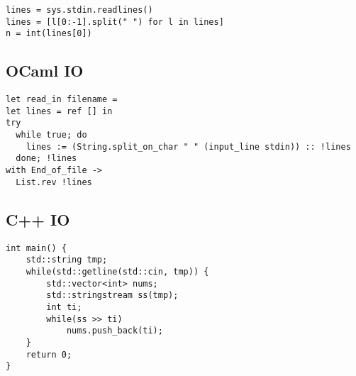 \documentclass[10pt,a4paper]{article}
\begin{document}
\begin{landscape}
\begin{multicols}{2}
\begin{lstlisting}
lines = sys.stdin.readlines()
lines = [l[0:-1].split(" ") for l in lines]
n = int(lines[0])
\end{lstlisting}

\subsection{OCaml IO}

\lstset{style=ocaml}

\begin{lstlisting}
let read_in filename = 
let lines = ref [] in
try
  while true; do
    lines := (String.split_on_char " " (input_line stdin)) :: !lines
  done; !lines
with End_of_file ->
  List.rev !lines
\end{lstlisting}

\subsection{C++ IO}

\begin{lstlisting}
int main() {
    std::string tmp;
    while(std::getline(std::cin, tmp)) {
        std::vector<int> nums;
        std::stringstream ss(tmp);
        int ti;
        while(ss >> ti) 
            nums.push_back(ti);
    }
    return 0;
}
\end{lstlisting}

\lstset{style=cpp}

\end{multicols}
\end{landscape}
\end{document}

